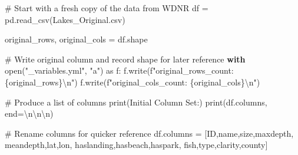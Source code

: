 \documentclass[
]{article}
\newenvironment{Shaded}{\begin{snugshade}}{\end{snugshade}}
\newcommand{\BuiltInTok}[1]{\textcolor[rgb]{0.00,0.23,0.31}{#1}}
\newcommand{\CharTok}[1]{\textcolor[rgb]{0.13,0.47,0.30}{#1}}
\newcommand{\CommentTok}[1]{\textcolor[rgb]{0.37,0.37,0.37}{#1}}
\newcommand{\ControlFlowTok}[1]{\textcolor[rgb]{0.00,0.23,0.31}{\textbf{#1}}}
\newcommand{\ImportTok}[1]{\textcolor[rgb]{0.00,0.46,0.62}{#1}}
\newcommand{\NormalTok}[1]{\textcolor[rgb]{0.00,0.23,0.31}{#1}}
\newcommand{\OperatorTok}[1]{\textcolor[rgb]{0.37,0.37,0.37}{#1}}
\newcommand{\SpecialCharTok}[1]{\textcolor[rgb]{0.37,0.37,0.37}{#1}}
\newcommand{\SpecialStringTok}[1]{\textcolor[rgb]{0.13,0.47,0.30}{#1}}
\newcommand{\StringTok}[1]{\textcolor[rgb]{0.13,0.47,0.30}{#1}}
\begin{document}
\begin{Shaded}
\begin{Highlighting}[]
\CommentTok{\# Start with a fresh copy of the data from WDNR}
\NormalTok{df }\OperatorTok{=}\NormalTok{ pd.read\_csv(}\StringTok{\textquotesingle{}Lakes\_Original.csv\textquotesingle{}}\NormalTok{)}

\NormalTok{original\_rows, original\_cols }\OperatorTok{=}\NormalTok{ df.shape}

\CommentTok{\# Write original column and record shape for later reference}
\ControlFlowTok{with} \BuiltInTok{open}\NormalTok{(}\StringTok{"\_variables.yml"}\NormalTok{, }\StringTok{"a"}\NormalTok{) }\ImportTok{as}\NormalTok{ f:}
\NormalTok{    f.write(}\SpecialStringTok{f"original\_rows\_count: }\SpecialCharTok{\{}\NormalTok{original\_rows}\SpecialCharTok{\}}\CharTok{\textbackslash{}n}\SpecialStringTok{"}\NormalTok{)}
\NormalTok{    f.write(}\SpecialStringTok{f"original\_cols\_count: }\SpecialCharTok{\{}\NormalTok{original\_cols}\SpecialCharTok{\}}\CharTok{\textbackslash{}n}\SpecialStringTok{"}\NormalTok{)}

\CommentTok{\# Produce a list of columns}
\BuiltInTok{print}\NormalTok{(}\StringTok{\textquotesingle{}Initial Column Set:\textquotesingle{}}\NormalTok{)}
\BuiltInTok{print}\NormalTok{(df.columns, end}\OperatorTok{=}\StringTok{\textquotesingle{}}\CharTok{\textbackslash{}n\textbackslash{}n\textbackslash{}n}\StringTok{\textquotesingle{}}\NormalTok{)}

\CommentTok{\# Rename columns for quicker reference}
\NormalTok{df.columns }\OperatorTok{=}\NormalTok{ [}\StringTok{\textquotesingle{}ID\textquotesingle{}}\NormalTok{,}\StringTok{\textquotesingle{}name\textquotesingle{}}\NormalTok{,}\StringTok{\textquotesingle{}size\textquotesingle{}}\NormalTok{,}\StringTok{\textquotesingle{}maxdepth\textquotesingle{}}\NormalTok{,}
              \StringTok{\textquotesingle{}meandepth\textquotesingle{}}\NormalTok{,}\StringTok{\textquotesingle{}lat\textquotesingle{}}\NormalTok{,}\StringTok{\textquotesingle{}lon\textquotesingle{}}\NormalTok{,}
              \StringTok{\textquotesingle{}haslanding\textquotesingle{}}\NormalTok{,}\StringTok{\textquotesingle{}hasbeach\textquotesingle{}}\NormalTok{,}\StringTok{\textquotesingle{}haspark\textquotesingle{}}\NormalTok{,}
              \StringTok{\textquotesingle{}fish\textquotesingle{}}\NormalTok{,}\StringTok{\textquotesingle{}type\textquotesingle{}}\NormalTok{,}\StringTok{\textquotesingle{}clarity\textquotesingle{}}\NormalTok{,}\StringTok{\textquotesingle{}county\textquotesingle{}}\NormalTok{]}


\end{Highlighting}
\end{Shaded}
\end{document}
